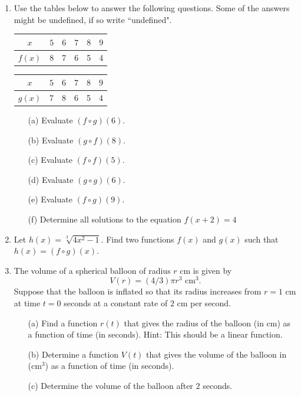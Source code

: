 \documentclass[12pt]{amsart}
\begin{document}
\begin{enumerate}
\item Use the tables below to answer the following questions. Some of the answers might be undefined, if so write ``undefined".

\begin{tabular}{| c | c | c | c | c | c |}
\hline
$x$ & $5$ & $6$ & $7$ & $8$ & $9$ \\
\hline
$f(x)$ & 8   & 7  & 6  & 5  & 4 \\
\hline
\end{tabular} \hspace{3cm}
\begin{tabular}{| c | c | c | c | c | c |}
\hline
$x$ & $5$ & $6$ & $7$ & $8$ & $9$ \\
\hline
$g(x)$ & 7   & 8  & 6  & 5  & 4 \\
\hline
\end{tabular}

\begin{itemize}
\item[(a)] Evaluate $(f \circ g)(6)$.
\item[(b)] Evaluate $(g \circ f)(8)$.
\item[(c)] Evaluate $(f \circ f)(5)$.
\item[(d)] Evaluate $(g \circ g)(6)$.
\item[(e)] Evaluate $(f \circ g)(9)$.
\item[(f)] Determine all solutions to the equation $f(x+2) = 4$
\end{itemize}

\item Let $h(x) = \sqrt[3]{4x^2-1}$. Find two functions $f(x)$ and $g(x)$ such that $h(x) = (f \circ g)(x)$.

\item The volume of a spherical balloon of radius $r$ cm is given by $$V(r) = (4/3) \pi r^3 \text{ cm}^3.$$ Suppose that the balloon is inflated so that its radius increases from $r = 1$ cm at time $t = 0$ seconds at a constant rate of $2$ cm per second.

\begin{itemize}
\item[(a)] Find a function $r(t)$ that gives the radius of the balloon (in cm) as a function of time (in seconds). Hint: This should be a linear function.
\item[(b)] Determine a function $V(t)$ that gives the volume of the balloon in (cm$^3$) as a function of time (in seconds).
\item[(c)] Determine the volume of the balloon after $2$ seconds. 
\end{itemize}


\end{enumerate}
\end{document}
